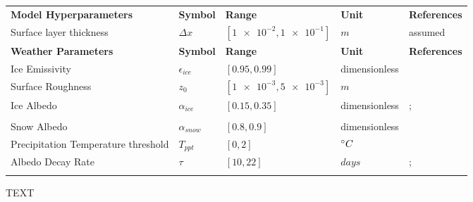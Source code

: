 \documentclass[tc, manuscript]{copernicus}
\begin{document}
\begin{table}
\begin{tabular}{lllll}
		\textbf{Model Hyperparameters} & \textbf{Symbol} & \textbf{Range} & \textbf{Unit} & \textbf{References} \\
    Surface layer thickness             & $\Delta x$            & $[\num{1e-2},\num{1e-1}]$           & $m$ & assumed
    \\\midrule
		\textbf{Weather Parameters} & \textbf{Symbol} & \textbf{Range} & \textbf{Unit} & \textbf{References} \\
    Ice Emissivity                      & $\epsilon_{ice}$      & $[0.95,0.99]$         & dimensionless & \citet{horiInsituMeasuredSpectral2006}             \\
    Surface Roughness                   & $z_0$                 & $[\num{1e-3},\num{5e-3}]$            & $m$  & \citet{brockMeasurementParameterizationAerodynamic2006}       \\
    Ice Albedo                          & $\alpha_{ice}$        & $[0.15,0.35]$         & dimensionless  &
    \citet{steinerModellingIcecliffBackwasting2015};            \\
    & &    &  & \citet{zollesRobustUncertaintyAssessment2019}      \\
    Snow Albedo                         & $\alpha_{snow}$       & $[0.8,0.9]$        & dimensionless  & \citet{zollesRobustUncertaintyAssessment2019}              \\
    Precipitation Temperature threshold & $T_{ppt}$             & $[0,2]$            & $^{\circ} C$& \citet{shichangResponseZhadangGlacier2010}  \\
    Albedo Decay Rate                   & $\tau$                & $[10,22]$           & $days$ &
    \citet{schmidtImportanceAccurateGlacier2017};      \\
    & &    &  & \citet{oerlemansYearRecordGlobal1998}      \\\midrule
	\end{tabular}
\end{table}
\clearpage


\noappendix 



\begin{acknowledgements}
TEXT
\end{acknowledgements}



\end{document}
